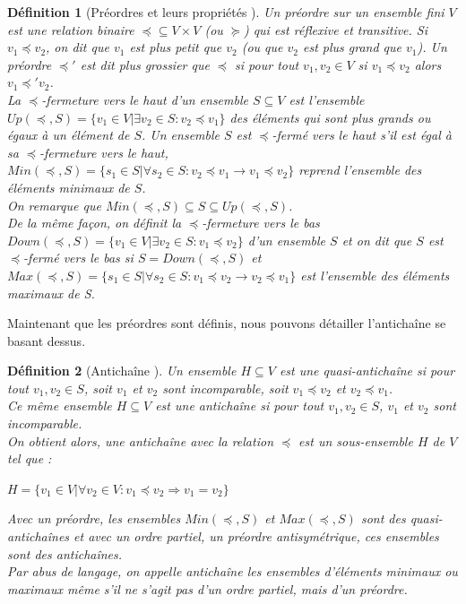 \documentclass[a4paper]{report}
\theoremstyle{break}
\newtheorem{defin}{Définition}
\begin{document}
\begin{defin}[Préordres et leurs propriétés \cite{doyen2010antichain}]
Un préordre sur un ensemble fini $V$ est une relation binaire $\preceq \subseteq V \times V$ (ou $\succeq$) qui est réflexive et transitive. Si $v_1 \preceq v_2$, on dit que $v_1$ est plus petit que $v_2$ (ou que $v_2$ est plus grand que $v_1$).
Un préordre $\preceq'$ est dit plus grossier que $\preceq$ si pour tout $v_1, v_2 \in V$ si $v_1 \preceq v_2$ alors $v_1 \preceq' v_2$.\\
La $\preceq$-fermeture vers le haut d'un ensemble $S \subseteq V$ est l'ensemble $Up(\preceq, S) = \{ v_1 \in V | \exists v_2 \in S : v_2 \preceq v_1 \}$ des éléments qui sont plus grands ou égaux à un élément de $S$.
Un ensemble $S$ est $\preceq$-fermé vers le haut s'il est égal à sa $\preceq$-fermeture vers le haut, $Min(\preceq, S) = \{s_1 \in S | \forall s_2 \in S : v_2 \preceq v_1 \rightarrow v_1 \preceq v_2 \}$ reprend l'ensemble des éléments minimaux de $S$.\\
On remarque que $Min(\preceq, S) \subseteq S \subseteq Up(\preceq, S)$.\\

De la même façon, on définit la $\preceq$-fermeture vers le bas $Down(\preceq, S) = \{ v_1 \in V | \exists v_2 \in S : v_1 \preceq v_2 \}$ d'un ensemble $S$ et on dit que $S$ est $\preceq$-fermé vers le bas si $S = Down(\preceq, S)$ et $Max(\preceq, S) = \{s_1 \in S | \forall s_2 \in S : v_1 \preceq v_2 \rightarrow v_2 \preceq v_1 \}$ est l'ensemble des éléments maximaux de S.

\end{defin}

Maintenant que les préordres sont définis, nous pouvons détailler l'antichaîne se basant dessus.

\begin{defin}[Antichaîne \cite{doyen2010antichain}]
Un ensemble $H \subseteq V$ est une quasi-antichaîne si pour tout $v_1 , v_2 \in S$, soit $v_1$ et $v_2$ sont incomparable, soit $ v_1 \preceq v_2$ et $v_2 \preceq v_1$.\\
Ce même ensemble $H \subseteq V$ est une antichaîne si pour tout $v_1 , v_2 \in S$, $v_1$ et $v_2$ sont incomparable.\\
On obtient alors, une antichaîne avec la relation $\preceq$ est un sous-ensemble $H$ de $V$ tel que :
\begin{center}
$H = \{v_1 \in V|\forall v_2 \in V : v_1 \preceq v_2 \Rightarrow v_1 = v_2\}$
\end{center}

Avec un préordre, les ensembles $Min(\preceq, S)$ et $Max(\preceq, S)$ sont des quasi-antichaînes et avec un ordre partiel, un préordre antisymétrique, ces ensembles sont des antichaînes.\\
Par abus de langage, on appelle antichaîne les ensembles d'éléments minimaux ou maximaux même s'il ne s'agit pas d'un ordre partiel, mais d'un préordre.

\end{defin}
\end{document}
